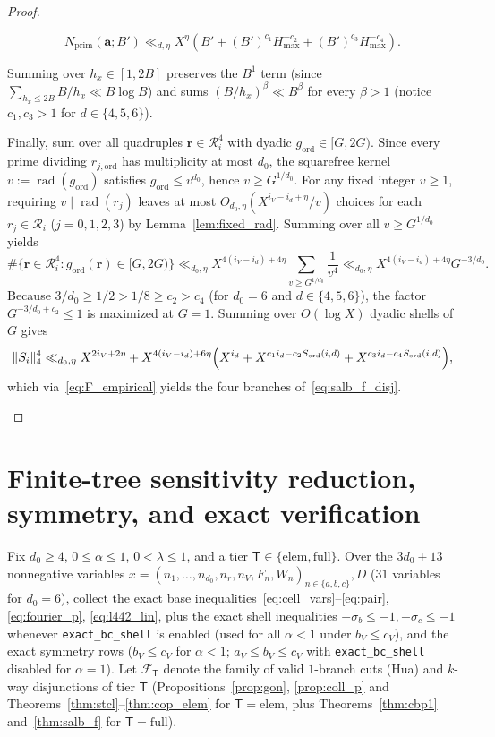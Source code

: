 \documentclass[11pt,a4paper]{amsart}
\theoremstyle{plain}
\theoremstyle{definition}
\theoremstyle{remark}
\DeclareMathOperator{\rad}{rad}
\begin{document}
\begin{proof}
\begin{itemize}[itemsep=2pt]
\begin{enumerate}[label=(\alph*),itemsep=1pt]
\[
  N_{\mathrm{prim}}(\mathbf{a}; B') \ll_{d,\eta} X^\eta \left(B' + (B')^{c_1} H_{\max}^{-c_2} + (B')^{c_3} H_{\max}^{-c_4}\right).
\]
\end{enumerate}
Summing over $h_x \in [1, 2B]$ preserves the $B^1$ term (since $\sum_{h_x \le 2B} B/h_x \ll B \log B$) and sums $(B/h_x)^\beta \ll B^\beta$ for every $\beta > 1$ (notice $c_1, c_3 > 1$ for $d \in \{4,5,6\}$).

Finally, sum over all quadruples $\mathbf{r} \in \mathcal{R}_i^4$ with dyadic $g_{\mathrm{ord}} \in [G, 2G)$. Since every prime dividing $r_{j,\mathrm{ord}}$ has multiplicity at most $d_0$, the squarefree kernel $v := \rad(g_{\mathrm{ord}})$ satisfies $g_{\mathrm{ord}} \le v^{d_0}$, hence $v \ge G^{1/d_0}$. For any fixed integer $v \ge 1$, requiring $v \mid \rad(r_j)$ leaves at most $O_{d_0,\eta}(X^{i_V - i_d + \eta} / v)$ choices for each $r_j \in \mathcal{R}_i$ ($j = 0,1,2,3$) by Lemma~\ref{lem:fixed_rad}. Summing over all $v \ge G^{1/d_0}$ yields
\[
  \#\bigl\{\mathbf{r} \in \mathcal{R}_i^4 : g_{\mathrm{ord}}(\mathbf{r}) \in [G, 2G)\bigr\}
  \ll_{d_0,\eta} X^{4(i_V - i_d) + 4\eta} \sum_{v \ge G^{1/d_0}} \frac{1}{v^4}
  \ll_{d_0,\eta} X^{4(i_V - i_d) + 4\eta} G^{-3/d_0}.
\]
Because $3/d_0 \ge 1/2 > 1/8 \ge c_2 > c_4$ (for $d_0 = 6$ and $d \in \{4,5,6\}$), the factor $G^{-3/d_0 + c_2} \le 1$ is maximized at $G = 1$. Summing over $O(\log X)$ dyadic shells of $G$ gives
\[
  \|S_i\|_4^4 \ll_{d_0,\eta} X^{2 i_V + 2\eta} + X^{4(i_V - i_d) + 6\eta}\Bigl(X^{i_d} + X^{c_1 i_d - c_2 S_{\mathrm{ord}}(i,d)} + X^{c_3 i_d - c_4 S_{\mathrm{ord}}(i,d)}\Bigr),
\]
which via~\eqref{eq:F_empirical} yields the four branches of~\eqref{eq:salb_f_disj}. \qedhere
\end{itemize}
\end{proof}

\section{Finite-tree sensitivity reduction, symmetry, and exact verification}\label{sec:reduction}

Fix $d_0 \ge 4$, $0 \le \alpha \le 1$, $0 < \lambda \le 1$, and a tier $\mathsf{T} \in \{\mathrm{elem}, \mathrm{full}\}$. Over the $3d_0 + 13$ nonnegative variables $x = (n_1,\dots,n_{d_0}, n_r, n_V, F_n, W_n)_{n \in \{a,b,c\}}, D$ ($31$ variables for $d_0 = 6$), collect the exact base inequalities~\eqref{eq:cell_vars}--\eqref{eq:pair}, \eqref{eq:fourier_p}, \eqref{eq:l442_lin}, plus the exact shell inequalities $-\sigma_b \le -1, -\sigma_c \le -1$ whenever \texttt{exact\_bc\_shell} is enabled (used for all $\alpha < 1$ under $b_V \le c_V$), and the exact symmetry rows ($b_V \le c_V$ for $\alpha < 1$; $a_V \le b_V \le c_V$ with \texttt{exact\_bc\_shell} disabled for $\alpha = 1$). Let $\mathcal{F}_{\mathsf{T}}$ denote the family of valid $1$-branch cuts (\textsf{Hua}) and $k$-way disjunctions of tier $\mathsf{T}$ (Propositions~\ref{prop:gon}, \ref{prop:coll_p} and Theorems~\ref{thm:stcl}--\ref{thm:cop_elem} for $\mathsf{T} = \mathrm{elem}$, plus Theorems~\ref{thm:cbp1} and~\ref{thm:salb_f} for $\mathsf{T} = \mathrm{full}$).
\end{document}
